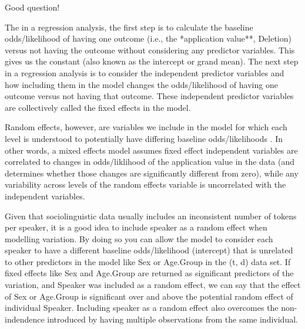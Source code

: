\documentclass[
  10pt,
  letterpaper]{article}
\renewcommand\texttt[1]{{\ttfamily\color{BrickRed}#1}}
\begin{document}
\begin{tcolorbox}[enhanced jigsaw, colbacktitle=quarto-callout-tip-color!10!white, opacityback=0, left=2mm, breakable, bottomrule=.15mm, colback=white, colframe=quarto-callout-tip-color-frame, toprule=.15mm, arc=.35mm, rightrule=.15mm, toptitle=1mm, opacitybacktitle=0.6, bottomtitle=1mm, coltitle=black, leftrule=.75mm, titlerule=0mm, title=\textcolor{quarto-callout-tip-color}{\faLightbulb}\hspace{0.5em}{What is a random effect?}]

Good question!

The in a regression analysis, the first step is to calculate the
baseline odds/likelihood of having one outcome (i.e., the *application
value**, \texttt{Deletion}) versus not having the outcome without
considering any predictor variables. This gives us the constant (also
known as the intercept or grand mean). The next step in a regression
analysis is to consider the independent predictor variables and how
including them in the model changes the odds/likelihood of having one
outcome versus not having that outcome. These independent predictor
variables are collectively called the fixed effects in the model.

Random effects, however, are variables we include in the model for which
each level is understood to potentially have differing baseline
odds/likelihoods . In other words, a mixed effects model assumes fixed
effect independent variables are correlated to changes in odds/liklihood
of the application value in the data (and determines whether those
changes are significantly different from zero), while any variability
across levels of the random effects variable is uncorrelated with the
independent variables.

Given that sociolinguistic data usually includes an inconsistent number
of tokens per speaker, it is a good idea to include speaker as a random
effect when modelling variation. By doing so you can allow the model to
consider each speaker to have a different baseline odds/likelihood
(intercept) that is unrelated to other predictors in the model like
\texttt{Sex} or \texttt{Age.Group} in the (t, d) data set. If fixed
effects like \texttt{Sex} and \texttt{Age.Group} are returned as
significant predictors of the variation, and \texttt{Speaker} was
included as a random effect, we can say that the effect of \texttt{Sex}
or \texttt{Age.Group} is significant over and above the potential random
effect of individual \texttt{Speaker}. Including speaker as a random
effect also overcomes the non-indendence introduced by having multiple
observations from the same individual.

\end{tcolorbox}
\end{document}
